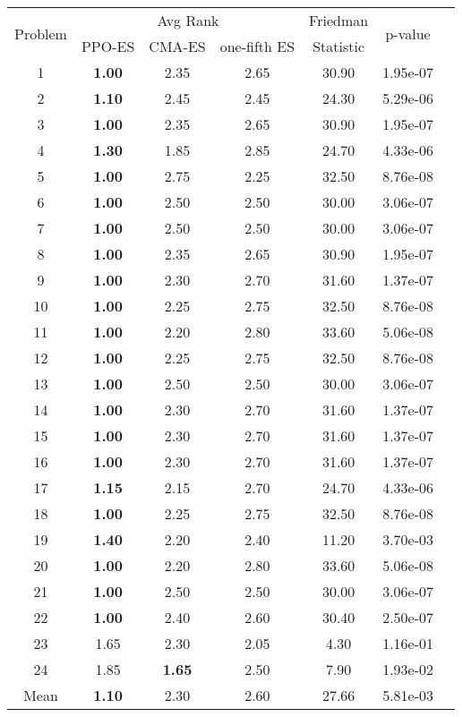 
        \begin{tabular}{ccccccc}
        \toprule
        \multirow{2}{*}{Problem} & \multicolumn{3}{c}{Avg Rank} & Friedman & \multirow{2}{*}{p-value} \\
        \cline{2-4}
        & PPO-ES & CMA-ES & one-fifth ES & Statistic & \\
        \midrule
        1 & \textbf{1.00} & 2.35 & 2.65 & 30.90 & 1.95e-07 \\
2 & \textbf{1.10} & 2.45 & 2.45 & 24.30 & 5.29e-06 \\
3 & \textbf{1.00} & 2.35 & 2.65 & 30.90 & 1.95e-07 \\
4 & \textbf{1.30} & 1.85 & 2.85 & 24.70 & 4.33e-06 \\
5 & \textbf{1.00} & 2.75 & 2.25 & 32.50 & 8.76e-08 \\
6 & \textbf{1.00} & 2.50 & 2.50 & 30.00 & 3.06e-07 \\
7 & \textbf{1.00} & 2.50 & 2.50 & 30.00 & 3.06e-07 \\
8 & \textbf{1.00} & 2.35 & 2.65 & 30.90 & 1.95e-07 \\
9 & \textbf{1.00} & 2.30 & 2.70 & 31.60 & 1.37e-07 \\
10 & \textbf{1.00} & 2.25 & 2.75 & 32.50 & 8.76e-08 \\
11 & \textbf{1.00} & 2.20 & 2.80 & 33.60 & 5.06e-08 \\
12 & \textbf{1.00} & 2.25 & 2.75 & 32.50 & 8.76e-08 \\
13 & \textbf{1.00} & 2.50 & 2.50 & 30.00 & 3.06e-07 \\
14 & \textbf{1.00} & 2.30 & 2.70 & 31.60 & 1.37e-07 \\
15 & \textbf{1.00} & 2.30 & 2.70 & 31.60 & 1.37e-07 \\
16 & \textbf{1.00} & 2.30 & 2.70 & 31.60 & 1.37e-07 \\
17 & \textbf{1.15} & 2.15 & 2.70 & 24.70 & 4.33e-06 \\
18 & \textbf{1.00} & 2.25 & 2.75 & 32.50 & 8.76e-08 \\
19 & \textbf{1.40} & 2.20 & 2.40 & 11.20 & 3.70e-03 \\
20 & \textbf{1.00} & 2.20 & 2.80 & 33.60 & 5.06e-08 \\
21 & \textbf{1.00} & 2.50 & 2.50 & 30.00 & 3.06e-07 \\
22 & \textbf{1.00} & 2.40 & 2.60 & 30.40 & 2.50e-07 \\
23 & 1.65 & 2.30 & 2.05 & 4.30 & 1.16e-01 \\
24 & 1.85 & \textbf{1.65} & 2.50 & 7.90 & 1.93e-02 \\
\midrule
Mean & \textbf{1.10} & 2.30 & 2.60 & 27.66 & 5.81e-03 \\
\bottomrule
\end{tabular}